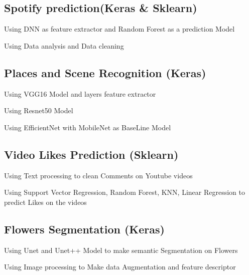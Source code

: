 \documentclass[letter,10pt]{article}
\begin{document}
\subsection{Spotify prediction(Keras & Sklearn)}
\begin{zitemize}
\item Using DNN as feature extractor  and Random Forest as a prediction Model \item Using Data analysis and Data cleaning

\end{zitemize}


\subsection{{Places and Scene Recognition (Keras)}}
\begin{zitemize}
\item Using VGG16 Model and layers feature extractor
\item Using Resnet50 Model
\item Using EfficientNet with MobileNet as BaseLine Model

\end{zitemize}

\subsection{{Video Likes Prediction (Sklearn)}}
\begin{zitemize}
\item Using Text processing to clean Comments on Youtube videos
\item Using Support Vector Regression, Random Forest, KNN, Linear Regression to predict Likes on the videos


\end{zitemize}

\subsection{{Flowers Segmentation (Keras)}}
\begin{zitemize}
\item Using Unet and Unet++ Model to make semantic Segmentation on Flowers
\item Using Image processing to Make data Augmentation and feature descriptor

\end{zitemize}
\end{document}
